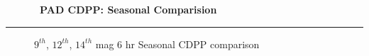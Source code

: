 % 
% 
% 
% 
% 
%
\cleardoublepage
\begin{figure*}[h!]
  \centering
  \hfill
  {\Huge {\bf \quarter\ PAD CDPP: Seasonal Comparision }}
  \hfill
\end{figure*}
\hrule
\begin{figure*}[h!]
  \centering
  \hfill
  \caption{$9^{th}$, $12^{th}$, $14^{th}$ mag 6 hr Seasonal CDPP comparison}
\end{figure*}

